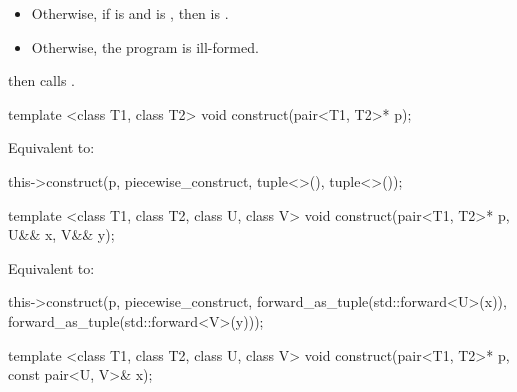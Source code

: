 \begin{itemdescr}
\begin{itemize}
\item Otherwise, if  is
 and
 is ,
then  is
.

\item Otherwise, the program is ill-formed.
\end{itemize}

then calls .
\end{itemdescr}

%
%
\begin{itemdecl}
template <class T1, class T2>
  void construct(pair<T1, T2>* p);
\end{itemdecl}

\begin{itemdescr}
\pnum
\effects Equivalent to:
\begin{codeblock}
this->construct(p, piecewise_construct, tuple<>(), tuple<>());
\end{codeblock}
\end{itemdescr}

%
%
\begin{itemdecl}
template <class T1, class T2, class U, class V>
  void construct(pair<T1, T2>* p, U&& x, V&& y);
\end{itemdecl}

\begin{itemdescr}
\pnum
\effects Equivalent to:
\begin{codeblock}
this->construct(p, piecewise_construct,
                forward_as_tuple(std::forward<U>(x)),
                forward_as_tuple(std::forward<V>(y)));
\end{codeblock}
\end{itemdescr}

%
%
\begin{itemdecl}
template <class T1, class T2, class U, class V>
  void construct(pair<T1, T2>* p, const pair<U, V>& x);
\end{itemdecl}

